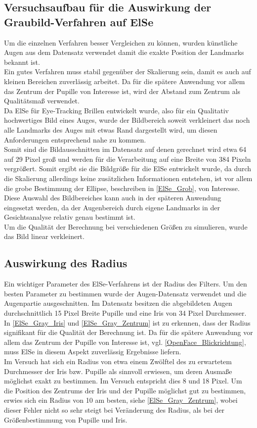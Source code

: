 \subsection{Versuchsaufbau für die Auswirkung der Graubild-Verfahren auf ElSe}
Um die einzelnen Verfahren besser Vergleichen zu können, wurden künstliche Augen aus dem Datensatz \cite{database_Eye} verwendet damit die exakte Position der Landmarks bekannt ist.\\
Ein gutes Verfahren muss stabil gegenüber der Skalierung sein, damit es auch auf kleinen Bereichen zuverlässig arbeitet. Da für die spätere Anwendung vor allem das Zentrum der Pupille von Interesse ist, wird der Abstand zum Zentrum als Qualitätsmaß verwendet.\\
Da ElSe für Eye-Tracking Brillen entwickelt wurde, also für ein Qualitativ hochwertiges Bild eines Auges, wurde der Bildbereich soweit verkleinert das noch alle Landmarks des Auges mit etwas Rand dargestellt wird, um diesen Anforderungen entsprechend nahe zu kommen.\\
Somit sind die Bildausschnitten im Datensatz auf denen gerechnet wird etwa 64 auf 29 Pixel groß und werden für die Verarbeitung auf eine Breite von 384 Pixeln vergrößert. Somit ergibt sie die Bildgröße für die ElSe entwickelt wurde, da durch die Skalierung allerdings keine zusätzlichen Informationen entstehen, ist vor allem die grobe Bestimmung der Ellipse, beschreiben in \autoref{ElSe_Grob}, von Interesse. Diese Auswahl des Bildbereiches kann auch in der späteren Anwendung eingesetzt werden, da der Augenbereich durch eigene Landmarks in der Gesichtsanalyse relativ genau bestimmt ist.\\
Um die Qualität der Berechnung bei verschiedenen Größen zu simulieren, wurde das Bild linear verkleinert.
\subsection{Auswirkung des Radius}
Ein wichtiger Parameter des ElSe-Verfahrens ist der Radius des Filters. Um den besten Parameter zu bestimmen wurde der Augen-Datensatz \cite{database_Eye} verwendet und die Augenpartie ausgeschnitten. Im Datensatz besitzen die abgebildeten Augen durchschnittlich 15 Pixel Breite Pupille und eine Iris von 34 Pixel Durchmesser.\\
In \autoref{ElSe_Gray_Iris} und \autoref{ElSe_Gray_Zentrum} ist zu erkennen, dass der Radius signifikant für die Qualität der Berechnung ist. Da für die spätere Anwendung vor allem das Zentrum der Pupille von Interesse ist, vgl. \autoref{OpenFace_Blickrichtung}, muss ElSe in diesem Aspekt zuverlässig Ergebnisse liefern.\\
Im Versuch hat sich ein Radius von etwa einem Zwölftel des zu erwartetem Durchmesser der Iris bzw. Pupille als sinnvoll erwiesen, um deren Ausmaße möglichst exakt zu bestimmen. Im Versuch entspricht dies 8 und 18 Pixel. Um die Position des Zentrums der Iris und der Pupille möglichst gut zu bestimmen, erwies sich ein Radius von 10 am besten, siehe \autoref{ElSe_Gray_Zentrum}, wobei dieser Fehler nicht so sehr steigt bei Veränderung des Radius, als bei der Größenbestimmung von Pupille und Iris.
